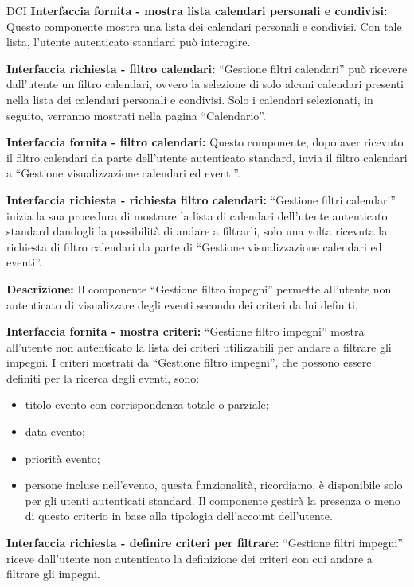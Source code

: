 \begin{listaPersonale}{DCI}
    \textbf{Interfaccia fornita - mostra lista calendari personali e condivisi:} Questo componente mostra una lista dei calendari personali e condivisi. Con tale lista, l'utente autenticato standard può interagire.

    \textbf{Interfaccia richiesta - filtro calendari:} “Gestione filtri calendari” può ricevere dall'utente un filtro calendari, ovvero la selezione di solo alcuni calendari presenti nella lista dei calendari personali e condivisi. Solo i calendari selezionati, in seguito, verranno mostrati nella pagina “Calendario”.

    \textbf{Interfaccia fornita - filtro calendari:} Questo componente, dopo aver ricevuto il filtro calendari da parte dell'utente autenticato standard, invia il filtro calendari a “Gestione visualizzazione calendari ed eventi”.


    \textbf{Interfaccia richiesta - richiesta filtro calendari:} “Gestione filtri calendari” inizia la sua procedura di mostrare la lista di calendari dell'utente autenticato standard dandogli la possibilità di andare a filtrarli, solo una volta ricevuta la richiesta di filtro calendari da parte di “Gestione visualizzazione calendari ed eventi”.



    \textbf{Descrizione:} Il componente “Gestione filtro impegni” permette all'utente non autenticato di visualizzare degli eventi secondo dei criteri da lui definiti.

    \textbf{Interfaccia fornita - mostra criteri:} “Gestione filtro impegni” mostra all'utente non autenticato la lista dei criteri utilizzabili per andare a filtrare gli impegni.
    I criteri mostrati da “Gestione filtro impegni”, che possono essere definiti per la ricerca degli eventi, sono:
    \begin{itemize}
        \item titolo evento con corrispondenza totale o parziale;
        \item data evento;
        \item priorità evento;
        \item persone incluse nell'evento, questa funzionalità, ricordiamo, è disponibile solo per gli utenti autenticati standard. Il componente gestirà la presenza o meno di questo criterio in base alla tipologia dell'account dell'utente.
    \end{itemize}

    \textbf{Interfaccia richiesta - definire criteri per filtrare:} “Gestione filtri impegni” riceve dall'utente non autenticato la definizione dei criteri con cui andare a filtrare gli impegni.


\end{listaPersonale}
